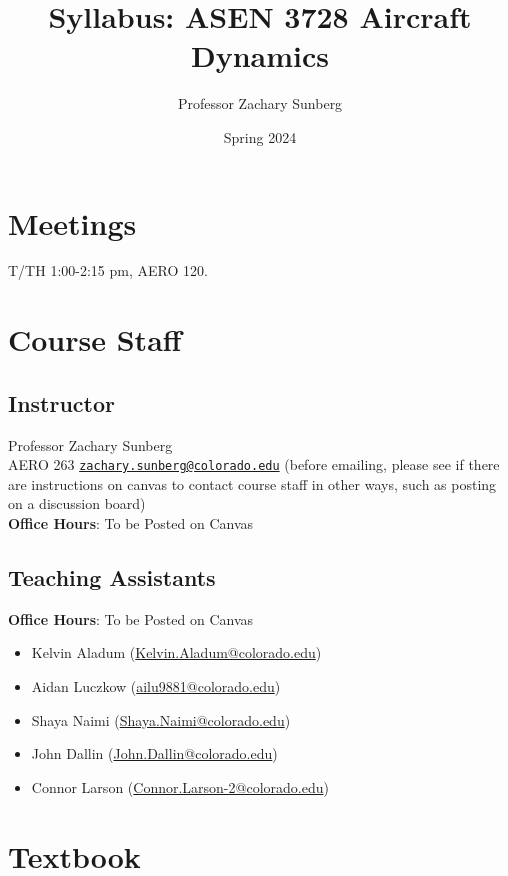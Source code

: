 \documentclass[9pt]{article}
\title{Syllabus: ASEN 3728 Aircraft Dynamics}
\author{Professor Zachary Sunberg}
\date{Spring 2024}
\begin{document}
\maketitle

\section*{Meetings}

T/TH 1:00-2:15 pm, AERO 120.

\section*{Course Staff}

\subsection*{Instructor}
Professor Zachary Sunberg\\
AERO 263 \href{mailto://zachary.sunberg@colorado.edu}{\nolinkurl{zachary.sunberg@colorado.edu}} (before emailing, please see if there are instructions on canvas to contact course staff in other ways, such as posting on a discussion board)\\
\textbf{Office Hours}: To be Posted on Canvas

\subsection*{Teaching Assistants}

\textbf{Office Hours}: To be Posted on Canvas

\begin{itemize}[noitemsep]
    \item Kelvin Aladum (\href{mailto://Kelvin.Aladum@colorado.edu}{Kelvin.Aladum@colorado.edu})
    \item Aidan Luczkow (\href{mailto://ailu9881@colorado.edu}{ailu9881@colorado.edu})
    \item Shaya Naimi (\href{mailto://Shaya.Naimi@colorado.edu}{Shaya.Naimi@colorado.edu})
    \item John Dallin (\href{mailto://john.dallin@colorado.edu}{John.Dallin@colorado.edu})
    \item Connor Larson (\href{mailto://Connor.Larson-2@colorado.edu}{Connor.Larson-2@colorado.edu})
\end{itemize}

\section*{Textbook}
\end{document}
